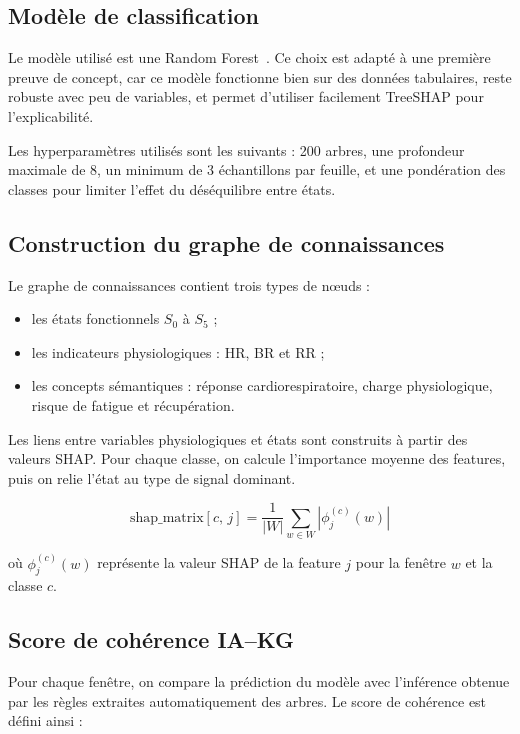 \documentclass[12pt,a4paper]{article}
\begin{document}
\subsection{Modèle de classification}

Le modèle utilisé est une Random Forest~\cite{breiman2001}. Ce choix est
adapté à une première preuve de concept, car ce modèle fonctionne bien sur
des données tabulaires, reste robuste avec peu de variables, et permet
d'utiliser facilement TreeSHAP pour l'explicabilité.

Les hyperparamètres utilisés sont les suivants : 200 arbres, une profondeur
maximale de 8, un minimum de 3 échantillons par feuille, et une pondération
des classes pour limiter l'effet du déséquilibre entre états.

\subsection{Construction du graphe de connaissances}

Le graphe de connaissances contient trois types de nœuds :

\begin{itemize}
  \item les états fonctionnels $S_0$ à $S_5$ ;
  \item les indicateurs physiologiques : HR, BR et RR ;
  \item les concepts sémantiques : réponse cardiorespiratoire, charge
        physiologique, risque de fatigue et récupération.
\end{itemize}

Les liens entre variables physiologiques et états sont construits à partir
des valeurs SHAP. Pour chaque classe, on calcule l'importance moyenne des
features, puis on relie l'état au type de signal dominant.

\begin{equation}
\text{shap\_matrix}[c,\, j]
  = \frac{1}{|W|} \sum_{w \in W} \left|\phi_j^{(c)}(w)\right|
\end{equation}

où $\phi_j^{(c)}(w)$ représente la valeur SHAP de la feature $j$ pour la
fenêtre $w$ et la classe $c$.

\subsection{Score de cohérence IA--KG}

Pour chaque fenêtre, on compare la prédiction du modèle avec l'inférence
obtenue par les règles extraites automatiquement des arbres. Le score de
cohérence est défini ainsi :
\end{document}
